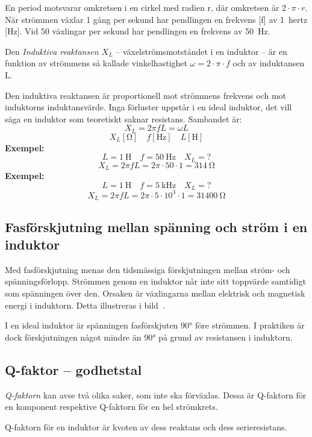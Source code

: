 En period motsvarar omkretsen i en cirkel med radien r, där omkretsen är
\(2 \cdot \pi  \cdot r\). När strömmen växlar 1 gång per sekund har
pendlingen en frekvens [f] av 1~hertz [Hz].
Vid 50 växlingar per sekund har pendlingen en frekvens av \qty{50}{\hertz}.

Den \emph{Induktiva reaktansen \(X_L\)} -- växelströmsmotståndet i en induktor -- 
är en funktion av strömmens så kallade vinkelhastighet \(\omega = 2 \cdot \pi  \cdot f\)
och av induktansen L.

Den induktiva reaktansen är proportionell mot strömmens frekvens och mot
induktorns induktansvärde.
Inga förluster uppstår i en ideal induktor, det vill säga en induktor som
teoretiskt saknar resistans.
Sambandet är:
\[X_L = 2\pi fL = \omega L\]
\[X_L [\unit{\ohm}] \quad f [\unit{\hertz}] \quad L [\unit{\henry}]\]
\textbf{Exempel:}
\[L = \qty{1}{\henry} \quad f = \qty{50}{\hertz} \quad X_L = ?\]
\[X_L = 2\pi fL = 2\pi \cdot 50 \cdot 1 = \qty{314}{\ohm}\]
\textbf{Exempel:}
\[L = \qty{1}{\henry} \quad f = \qty{5}{\kilo\hertz} \quad X_L = ?\]
\[X_L = 2\pi fL = 2\pi  \cdot 5 \cdot 10^3 \cdot 1 = \qty{31400}{\ohm}\]

\subsection{Fasförskjutning mellan spänning och ström i en induktor}

Med fasförskjutning menas den tidsmässiga förskjutningen mellan ström- och
spänningsförlopp.
Strömmen genom en induktor når inte sitt toppvärde samtidigt
som spänningen över den.
Orsaken är växlingarna mellan elektrisk och magnetisk energi i induktorn.
Detta illustreras i bild~.

I en ideal induktor är spänningen fasförskjuten \ang{90} före strömmen.
I praktiken är dock förskjutningen något mindre än \ang{90} på grund av
resistansen i induktorn.

\subsection{Q-faktor -- godhetstal}

\emph{Q-faktorn} kan avse två olika saker, som inte ska förväxlas.
Dessa är Q-faktorn för en komponent respektive Q-faktorn för en hel strömkrets.

Q-faktorn för en induktor är kvoten av dess reaktans och dess serieresistans.

